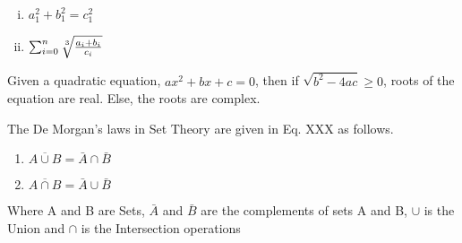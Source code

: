 \documentclass{article}
\begin{document}
	\large
	\begin{enumerate}[i.]
		\item $a_1^2 + b_1^2 = c_1^2 $
		\item $ \sum_{i=0}^{n} \sqrt[\leftroot{-1} \uproot{2} 3]{\frac{a_i + b_i}{c_i}} $
	\end{enumerate}
	Given a quadratic equation, $ax^2+bx+c=0$, then if $\sqrt{b^2-4ac} \geq 0$, roots of
	the equation are real. Else, the roots are complex.
	
	The De Morgan’s laws in Set Theory are given in Eq. XXX as follows.
	\begin{enumerate}
		\item $\overline{A \cup B} = \bar{A} \cap \bar{B} $
		\item $\overline{A \cap B} = \bar{A} \cup \bar{B} $
	\end{enumerate}
	Where A and B are Sets, $\bar{A}$ and $\bar{B}$ are the complements of sets A and B, $\cup$ is
	the Union and $\cap$ is the Intersection operations
\end{document}
